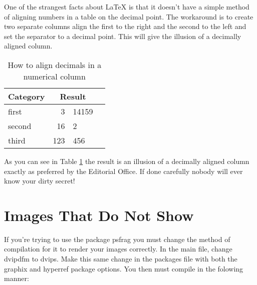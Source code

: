 One of the strangest facts about LaTeX is that it doesn't have a simple method of aligning numbers in a table on the decimal point. The workaround is to create two separate columns align the first to the right and the second to the left and set the separator to a decimal point. This will give the illusion of a decimally aligned column. \citep{Chwang74}

\begin{table}[h!]
\caption{How to align decimals in a numerical column}\label{tb1}
  \begin{tabular}{p{3 in} r@{.}l c}
 \hline
 Category & \multicolumn{2}{c}{Result}  & \hspace{2.2 in} \\
 \hline
  first & 3&14159 & \hspace{2.2 in} \\
  second & 16&2 & \hspace{2.2 in} \\
  third & 123&456 & \hspace{2.2 in} \\
  \hline
  \end{tabular}
\end{table}


\noindent As you can see in Table \ref{tb1} the result is an illusion of a decimally aligned column exactly as preferred by the Editorial Office. If done carefully nobody will ever know your dirty secret!


\section{Images That Do Not Show}

If you're trying to use the package psfrag you must change the method of compilation for it to render your images correctly. In the main file, change dvipdfm to dvips. Make this same change in the packages file with both the graphix and hyperref package options. You then must compile in the folowing manner:

